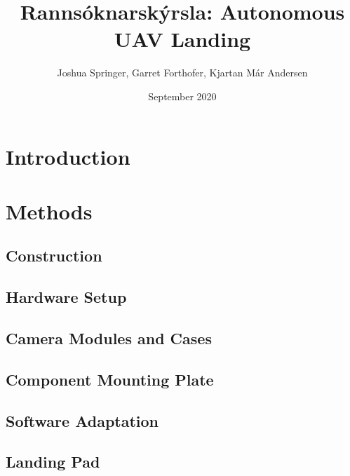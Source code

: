 \documentclass{article}
\title{Rannsóknarskýrsla: Autonomous UAV Landing}
\author{Joshua Springer, Garret Forthofer, Kjartan Már Andersen}
\date{September 2020}
\begin{document}
\maketitle

\begin{abstract}
    
\end{abstract}

% 
\section{Introduction}


\section{Methods}


\subsection{Construction}


\subsection{Hardware Setup}


\subsection{Camera Modules and Cases}


\subsection{Component Mounting Plate}


\subsection{Software Adaptation}


\subsection{Landing Pad}

\end{document}
